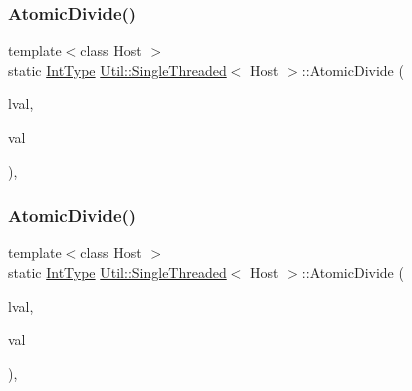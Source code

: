 \mbox{\label{classUtil_1_1SingleThreaded_ab6c6cc9b62833f2a6e9f52aac7243a74}} 
\subsubsection{\texorpdfstring{AtomicDivide()}{AtomicDivide()}\hspace{0.1cm}{\footnotesize\ttfamily [1/4]}}
{\footnotesize\ttfamily template$<$class Host $>$ \\
static \mbox{\hyperlink{classUtil_1_1SingleThreaded_a35932213fb0c15a7b67ced79bc2af4c6}{Int\+Type}} \mbox{\hyperlink{classUtil_1_1SingleThreaded}{Util\+::\+Single\+Threaded}}$<$ Host $>$\+::Atomic\+Divide (\begin{DoxyParamCaption}\item[{volatile \mbox{\hyperlink{classUtil_1_1SingleThreaded_a35932213fb0c15a7b67ced79bc2af4c6}{Int\+Type}} \&}]{lval,  }\item[{\mbox{\hyperlink{classUtil_1_1SingleThreaded_a35932213fb0c15a7b67ced79bc2af4c6}{Int\+Type}}}]{val }\end{DoxyParamCaption})\hspace{0.3cm}{\ttfamily [inline]}, {\ttfamily [static]}}

\mbox{\label{classUtil_1_1SingleThreaded_ab6c6cc9b62833f2a6e9f52aac7243a74}} 
\subsubsection{\texorpdfstring{AtomicDivide()}{AtomicDivide()}\hspace{0.1cm}{\footnotesize\ttfamily [2/4]}}
{\footnotesize\ttfamily template$<$class Host $>$ \\
static \mbox{\hyperlink{classUtil_1_1SingleThreaded_a35932213fb0c15a7b67ced79bc2af4c6}{Int\+Type}} \mbox{\hyperlink{classUtil_1_1SingleThreaded}{Util\+::\+Single\+Threaded}}$<$ Host $>$\+::Atomic\+Divide (\begin{DoxyParamCaption}\item[{volatile \mbox{\hyperlink{classUtil_1_1SingleThreaded_a35932213fb0c15a7b67ced79bc2af4c6}{Int\+Type}} \&}]{lval,  }\item[{\mbox{\hyperlink{classUtil_1_1SingleThreaded_a35932213fb0c15a7b67ced79bc2af4c6}{Int\+Type}}}]{val }\end{DoxyParamCaption})\hspace{0.3cm}{\ttfamily [inline]}, {\ttfamily [static]}}

